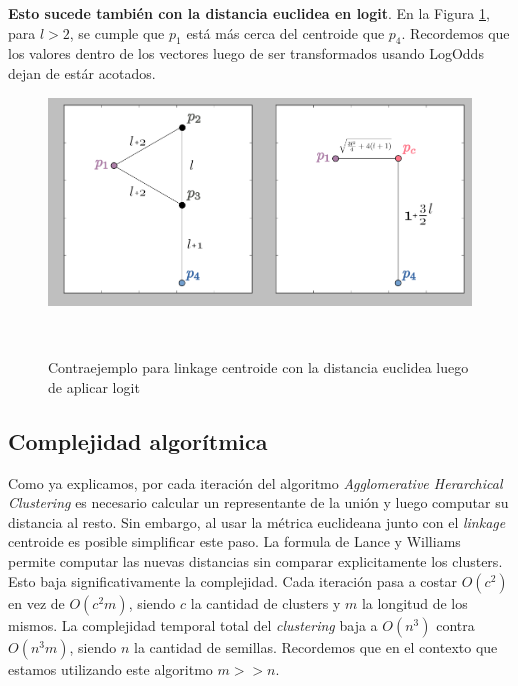\textbf{Esto sucede tambi\'en con la distancia euclidea en logit}. En la Figura
\ref{fig:euc_cen}, para $l>2$, se cumple que $p_1$ est\'a m\'as cerca del centroide
que $p_4$. Recordemos que los valores dentro de los vectores luego de ser 
transformados usando LogOdds dejan de est\'ar acotados.

\begin{figure}[h!]
                                                                                                                        
\begin{minipage}[b]{\textwidth}
    \includegraphics[width=\textwidth]{img/euclidean_centroid.png}
    \caption{Contraejemplo para linkage centroide con la distancia euclidea 
             luego de aplicar logit}
    \label{fig:euc_cen}
\end{minipage} ~

\end{figure}  

\subsection{Complejidad algor\'itmica}

Como ya explicamos, por cada iteraci\'on del algoritmo 
\textit{Agglomerative Herarchical Clustering} es necesario calcular un 
representante de la uni\'on y luego computar su distancia al resto. Sin embargo, 
al usar la m\'etrica euclideana junto con el \textit{linkage} centroide es posible
simplificar este paso. La formula de Lance y Williams permite computar las nuevas
distancias sin comparar explicitamente los clusters. Esto baja significativamente
la complejidad. Cada iteraci\'on pasa a costar $O(c^2)$ en vez de $O(c^2 m)$,
siendo $c$ la cantidad de clusters y $m$ la longitud de los mismos. La complejidad
temporal total del \textit{clustering} baja a $O(n^3)$ contra $O(n^3 m)$, siendo
$n$ la cantidad de semillas. Recordemos que en el contexto que estamos utilizando
este algoritmo $m>>n$.  

